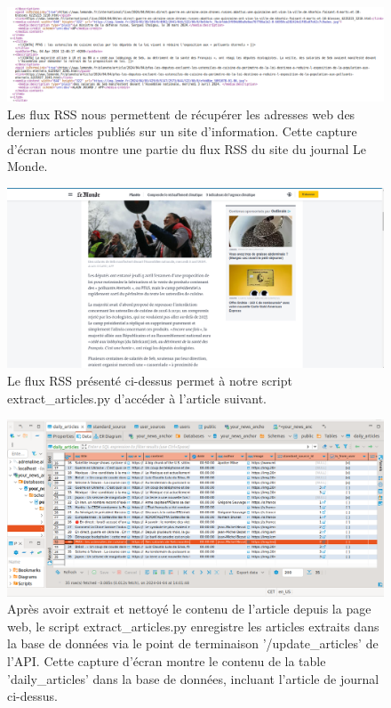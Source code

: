 \documentclass[french]{article}
\begin{document}
    \begin{figure}[h!]
        \includegraphics[width=12cm]{rss}
        \centering
        \caption{Les flux RSS nous permettent de récupérer les adresses web des derniers articles publiés sur un site d'information. Cette capture d'écran nous montre une partie du flux RSS du site du journal Le Monde.}
        \centering
    \end{figure}
    \begin{figure}[h!]
        \includegraphics[width=12cm]{original_website}
        \centering
        \caption{Le flux RSS présenté ci-dessus permet à notre script extract\_articles.py d'accéder à l'article suivant.}
        \centering
    \end{figure}
    \begin{figure}[h!]
        \includegraphics[width=12cm]{db_2}
        \centering
        \caption{Après avoir extrait et nettoyé le contenu de l'article depuis la page web, le script extract\_articles.py enregistre les articles extraits dans la base de données via le point de terminaison '/update\_articles' de l'API. Cette capture d'écran montre le contenu de la table 'daily\_articles' dans la base de données, incluant l'article de journal ci-dessus.}
        \centering
    \end{figure}
\end{document}
